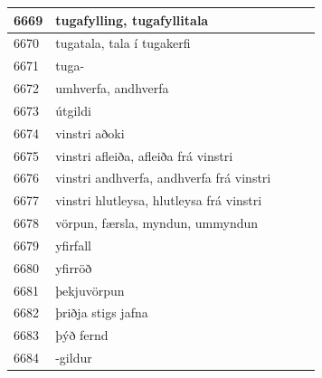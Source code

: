 \begin{longtable}{p{}|p{}|p{}|p{}|p{}}
\hline
6669 & tugafylling, tugafyllitala &  &  &  \\
\hline
6670 & tugatala, tala í tugakerfi &  &  &  \\
\hline
6671 & tuga- &  &  &  \\
\hline
6672 & umhverfa, andhverfa &  &  &  \\
\hline
6673 & útgildi &  &  &  \\
\hline
6674 & vinstri aðoki &  &  &  \\
\hline
6675 & vinstri afleiða, afleiða frá vinstri &  &  &  \\
\hline
6676 & vinstri andhverfa, andhverfa frá vinstri &  &  &  \\
\hline
6677 & vinstri hlutleysa, hlutleysa frá vinstri &  &  &  \\
\hline
6678 & vörpun, færsla, myndun, ummyndun &  &  &  \\
\hline
6679 & yfirfall &  &  &  \\
\hline
6680 & yfirröð &  &  &  \\
\hline
6681 & þekjuvörpun &  &  &  \\
\hline
6682 & þriðja stigs jafna &  &  &  \\
\hline
6683 & þýð fernd &  &  &  \\
\hline
6684 & -gildur &  &  &  \\
\hline
\end{longtable}
